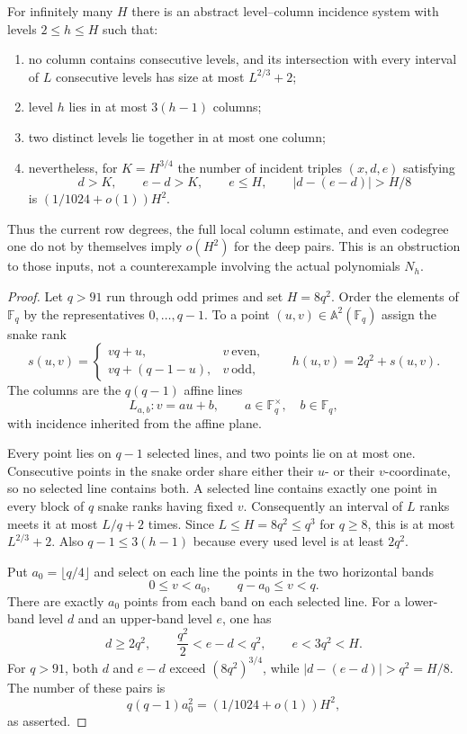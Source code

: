 \begin{proposition}
\label{prop:gcdtail-affine-plane-obstruction}
For infinitely many $H$ there is an abstract level--column incidence
system with levels $2\leq h\leq H$ such that:
\begin{enumerate}
 \item no column contains consecutive levels, and its intersection with
       every interval of $L$ consecutive levels has size at most
       $L^{2/3}+2$;
 \item level $h$ lies in at most $3(h-1)$ columns;
 \item two distinct levels lie together in at most one column;
 \item nevertheless, for $K=H^{3/4}$ the number of incident triples
       $(x,d,e)$ satisfying
       \[
        d>K,\qquad e-d>K,\qquad e\leq H,
        \qquad |d-(e-d)|>H/8
       \]
       is $(1/1024+o(1))H^2$.
\end{enumerate}
Thus the current row degrees, the full local column estimate, and even
codegree one do not by themselves imply $o(H^2)$ for the deep pairs.
This is an obstruction to those inputs, not a counterexample involving
the actual polynomials $N_h$.
\end{proposition}

\begin{proof}
Let $q>91$ run through odd primes and set $H=8q^2$.  Order the elements
of $\mathbb F_q$ by the representatives $0,\ldots,q-1$.  To a point
$(u,v)\in\mathbb A^2(\mathbb F_q)$ assign the snake rank
\[
 s(u,v)=
 \begin{cases}
  vq+u,&v\ \text{even},\\
  vq+(q-1-u),&v\ \text{odd},
 \end{cases}
 \qquad h(u,v)=2q^2+s(u,v).
\]
The columns are the $q(q-1)$ affine lines
\[
 L_{a,b}:v=au+b,\qquad
 a\in\mathbb F_q^\times,\quad b\in\mathbb F_q,
\]
with incidence inherited from the affine plane.

Every point lies on $q-1$ selected lines, and two points lie on at most
one.  Consecutive points in the snake order share either their $u$- or
their $v$-coordinate, so no selected line contains both.  A selected line
contains exactly one point in every block of $q$ snake ranks having fixed
$v$.  Consequently an interval of $L$ ranks meets it at most $L/q+2$
times.  Since $L\leq H=8q^2\leq q^3$ for $q\geq8$, this is at most
$L^{2/3}+2$.  Also $q-1\leq3(h-1)$ because every used level is at least
$2q^2$.

Put $a_0=\lfloor q/4\rfloor$ and select on each line the points in the
two horizontal bands
\[
 0\leq v<a_0,\qquad q-a_0\leq v<q.
\]
There are exactly $a_0$ points from each band on each selected line.
For a lower-band level $d$ and an upper-band level $e$, one has
\[
 d\geq2q^2,\qquad \frac{q^2}{2}<e-d<q^2,\qquad e<3q^2<H.
\]
For $q>91$, both $d$ and $e-d$ exceed
$(8q^2)^{3/4}$, while $|d-(e-d)|>q^2=H/8$.  The number of these pairs is
\[
 q(q-1)a_0^2=(1/1024+o(1))H^2,
\]
as asserted.
\end{proof}

